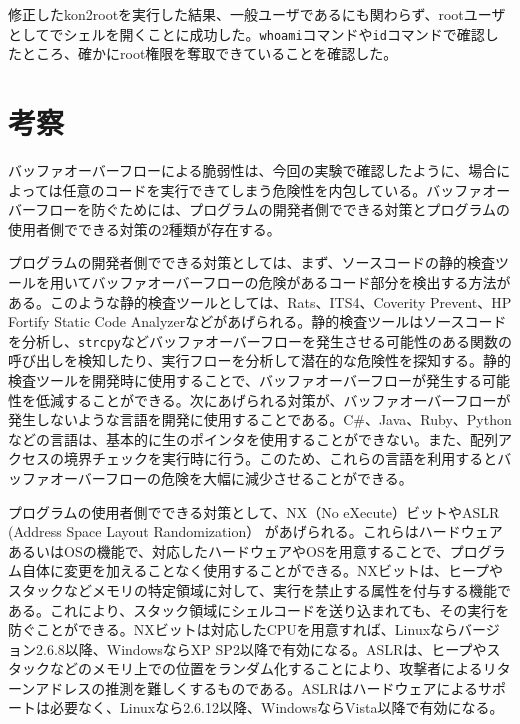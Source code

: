 修正したkon2rootを実行した結果、一般ユーザであるにも関わらず、rootユーザとしてでシェルを開くことに成功した。\texttt{whoami}コマンドや\texttt{id}コマンドで確認したところ、確かにroot権限を奪取できていることを確認した。

\section{考察}

バッファオーバーフローによる脆弱性は、今回の実験で確認したように、場合によっては任意のコードを実行できてしまう危険性を内包している。バッファオーバーフローを防ぐためには、プログラムの開発者側でできる対策とプログラムの使用者側でできる対策の2種類が存在する。

プログラムの開発者側でできる対策としては、まず、ソースコードの静的検査ツールを用いてバッファオーバーフローの危険があるコード部分を検出する方法がある。このような静的検査ツールとしては、Rats、ITS4、Coverity
Prevent、HP Fortify Static Code
Analyzerなどがあげられる。静的検査ツールはソースコードを分析し、\texttt{strcpy}などバッファオーバーフローを発生させる可能性のある関数の呼び出しを検知したり、実行フローを分析して潜在的な危険性を探知する。静的検査ツールを開発時に使用することで、バッファオーバーフローが発生する可能性を低減することができる。次にあげられる対策が、バッファオーバーフローが発生しないような言語を開発に使用することである。C\#、Java、Ruby、Pythonなどの言語は、基本的に生のポインタを使用することができない。また、配列アクセスの境界チェックを実行時に行う。このため、これらの言語を利用するとバッファオーバーフローの危険を大幅に減少させることができる。

プログラムの使用者側でできる対策として、NX（No eXecute）ビットやASLR
(Address Space Layout Randomization）
があげられる。これらはハードウェアあるいはOSの機能で、対応したハードウェアやOSを用意することで、プログラム自体に変更を加えることなく使用することができる。NXビットは、ヒープやスタックなどメモリの特定領域に対して、実行を禁止する属性を付与する機能である。これにより、スタック領域にシェルコードを送り込まれても、その実行を防ぐことができる。NXビットは対応したCPUを用意すれば、Linuxならバージョン2.6.8以降、WindowsならXP
SP2以降で有効になる。ASLRは、ヒープやスタックなどのメモリ上での位置をランダム化することにより、攻撃者によるリターンアドレスの推測を難しくするものである。ASLRはハードウェアによるサポートは必要なく、Linuxなら2.6.12以降、WindowsならVista以降で有効になる。
